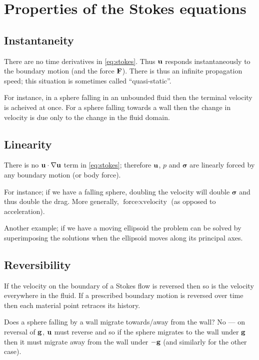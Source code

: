 \documentclass{notes}
\newcommand{\bs}{\boldsymbol{\sigma}}
\theoremstyle{plain}
\begin{document}
\section{Properties of the Stokes equations}

\subsection{Instantaneity}

There are no time derivatives in \eqref{eq:stokes}.  Thus $\mathbf{u}$ responds
instantaneously to the boundary motion (and the force $\mathbf{F}$).  There
is thus an infinite propagation speed; this situation is sometimes called
``quasi-static''.

For instance, in a sphere falling in an unbounded fluid then the terminal
velocity is acheived at once.  For a sphere falling towards a wall then
the change in velocity is due only to the change in the fluid domain.

\subsection{Linearity}

There is no $\mathbf{u} \cdot \nabla \mathbf{u}$ term in \eqref{eq:stokes}; therefore
$\mathbf{u}$, $p$ and $\bs$ are linearly forced by any boundary motion
(or body force).

For instance; if we have a falling sphere, doubling the velocity will double
$\bs$ and thus double the drag.  More generally,
$\text{force} \propto \text{velocity}$ (as opposed to acceleration).

Another example; if we have a moving ellipsoid the problem can be solved by
superimposing the solutions when the ellipsoid moves along its principal axes.

\subsection{Reversibility}

If the velocity on the boundary of a Stokes flow is reversed then so is
the velocity everywhere in the fluid.  If a prescribed boundary motion is
reversed over time then each material point retraces its history.

\vspace{1in}

Does a sphere falling by a wall migrate towards/away from the wall?
No --- on reversal of $\mathbf{g}$, $\mathbf{u}$ must reverse and so if the
sphere migrates to the wall under $\mathbf{g}$ then it must migrate away
from the wall under $-\mathbf{g}$ (and similarly for the other case).
\end{document}
